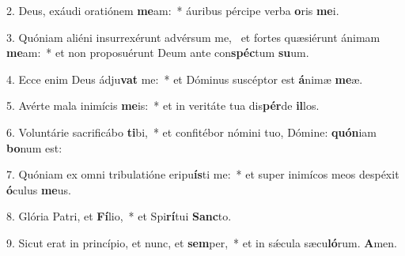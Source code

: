 2. Deus, exáudi oratiónem \textbf{me}am:~*  áuribus pércipe verba \textbf{o}ris \textbf{me}i.\

3. Quóniam aliéni insurrexérunt advérsum me, \dag\  et fortes quæsiérunt ánimam \textbf{me}am:~*  et non proposuérunt Deum ante con\textbf{spéc}tum \textbf{su}um.\

4. Ecce enim Deus ádju\textbf{vat} me:~*  et Dóminus suscéptor est \textbf{á}nimæ \textbf{me}æ.\

5. Avérte mala inimícis \textbf{me}is:~*  et in veritáte tua dis\textbf{pér}de \textbf{il}los.\

6. Voluntárie sacrificábo \textbf{ti}bi,~*  et confitébor nómini tuo, Dómine: \textbf{quón}iam \textbf{bo}num est:\

7. Quóniam ex omni tribulatióne eripu\textbf{ís}ti me:~*  et super inimícos meos despéxit \textbf{ó}culus \textbf{me}us.\

8. Glória Patri, et \textbf{Fí}lio,~*  et Spi\textbf{rí}tui \textbf{Sanc}to.\

9. Sicut erat in princípio, et nunc, et \textbf{sem}per,~*  et in sǽcula sæcu\textbf{ló}rum. \textbf{A}men.\

